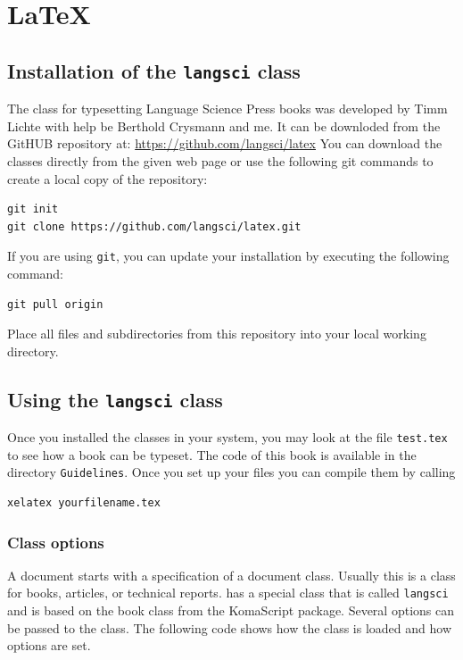 \chapter{\LaTeX}


\section{Installation of the \texttt{langsci} class}

The \latex class for typesetting Language Science Press books was developed by Timm
Lichte with
help be Berthold Crysmann and me. It can be downloded from the GitHUB repository at: \url{https://github.com/langsci/latex}
You can download the classes directly from the given web page or use the following git commands to
create a local copy of the repository:
\begin{verbatim}
git init
git clone https://github.com/langsci/latex.git 
\end{verbatim}
If you are using \texttt{git}, you can update your installation by executing the following command:
\begin{verbatim}
git pull origin
\end{verbatim}

Place all files and subdirectories from this repository into your local working directory.

\section{Using the \texttt{langsci} class}

Once you installed the classes in your system, you may look at the file \texttt{test.tex} to see how
a book can be typeset. The code of this book is available in the directory \texttt{Guidelines}. Once
you set up your \latex files you can compile them by calling 
\begin{verbatim}
xelatex yourfilename.tex
\end{verbatim}



\subsection{Class options}

A \latex document starts with a specification of a document class. Usually this is a class for
books, articles, or technical reports. \lsp has a special class that is called \texttt{langsci} and is
based on the book class from the KomaScript package. Several options can be passed to the class. The
following code shows how the class is loaded and how options are set. 


